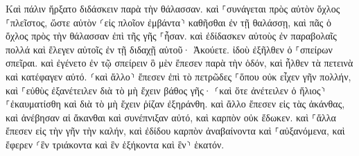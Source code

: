 \documentclass{openreader}
\begin{document}
Καὶ πάλιν ἤρξατο διδάσκειν παρὰ τὴν θάλασσαν. καὶ ⸀συνάγεται πρὸς αὐτὸν ὄχλος ⸀πλεῖστος, ὥστε αὐτὸν ⸂εἰς πλοῖον ἐμβάντα⸃ καθῆσθαι ἐν τῇ θαλάσσῃ, καὶ πᾶς ὁ ὄχλος πρὸς τὴν θάλασσαν ἐπὶ τῆς γῆς ⸀ἦσαν. 
καὶ ἐδίδασκεν αὐτοὺς ἐν παραβολαῖς πολλά καὶ ἔλεγεν αὐτοῖς ἐν τῇ διδαχῇ αὐτοῦ· 
Ἀκούετε. ἰδοὺ ἐξῆλθεν ὁ ⸀σπείρων σπεῖραι. 
καὶ ἐγένετο ἐν τῷ σπείρειν ὃ μὲν ἔπεσεν παρὰ τὴν ὁδόν, καὶ ἦλθεν τὰ πετεινὰ καὶ κατέφαγεν αὐτό. 
⸂καὶ ἄλλο⸃ ἔπεσεν ἐπὶ τὸ πετρῶδες ⸀ὅπου οὐκ εἶχεν γῆν πολλήν, καὶ ⸀εὐθὺς ἐξανέτειλεν διὰ τὸ μὴ ἔχειν βάθος γῆς· 
⸂καὶ ὅτε ἀνέτειλεν ὁ ἥλιος⸃ ⸀ἐκαυματίσθη καὶ διὰ τὸ μὴ ἔχειν ῥίζαν ἐξηράνθη. 
καὶ ἄλλο ἔπεσεν εἰς τὰς ἀκάνθας, καὶ ἀνέβησαν αἱ ἄκανθαι καὶ συνέπνιξαν αὐτό, καὶ καρπὸν οὐκ ἔδωκεν. 
καὶ ⸀ἄλλα ἔπεσεν εἰς τὴν γῆν τὴν καλήν, καὶ ἐδίδου καρπὸν ἀναβαίνοντα καὶ ⸀αὐξανόμενα, καὶ ἔφερεν ⸂ἓν τριάκοντα καὶ ἓν ἑξήκοντα καὶ ἓν⸃ ἑκατόν. 
\end{document}
